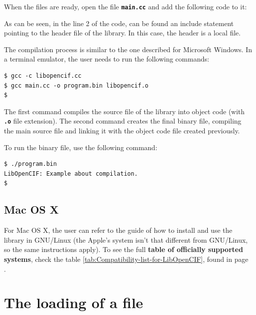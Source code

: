 \documentclass[11pt,twoside,openany,x11names,svgnames]{memoir}
\begin{document}
When the files are ready, open the file \textbf{\texttt{main.cc}} and add the following code to it:



As can be seen, in the line 2 of the code, can be found an include statement pointing to the  header file of the library. In this case, the header is a local file.

The compilation process is similar to the one described for Microsoft Windows. In a terminal emulator, the user needs to run the following commands:

\begin{lstlisting}[frame=single,style=SystemCommandStyle]
$ gcc -c libopencif.cc
$ gcc main.cc -o program.bin libopencif.o
$
\end{lstlisting}

The first command compiles the source file of the library into object code (with \textbf{\texttt{.o}} file extension). The second command creates the final binary file, compiling the main source file and linking it with the object code file created previously.

To run the binary file, use the following command:

\begin{lstlisting}[frame=single,style=SystemCommandStyle]
$ ./program.bin
LibOpenCIF: Example about compilation.
$
\end{lstlisting}

\subsection{Mac OS X}\label{Mac-OS-X}

For Mac OS X, the user can refer to the guide of how to install and use the library in GNU/Linux (the Apple's system isn't that different from GNU/Linux, so the same instructions apply). To see the full \textbf{table of officially supported systems}, check the table \ref{tab:Compatibility-list-for-LibOpenCIF}, found in page \pageref{tab:Compatibility-list-for-LibOpenCIF}.

\section{The loading of a file}\label{The-loading-of-a-file}
\end{document}
